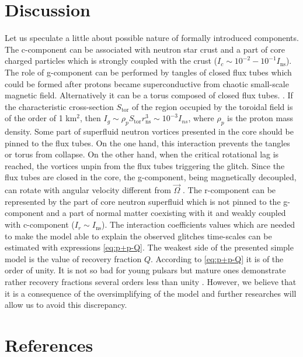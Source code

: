 \documentclass[a4paper]{jpconf}
\begin{document}
          
  \section{Discussion}    
    Let us speculate a little about possible nature of formally introduced components.
    The c-component can be associated with neutron star crust and a part of core charged particles which is strongly coupled with the crust ($I_c\sim10^{-2}-10^{-1}I_\mathrm{ns}$). 
    The role of g-component can be performed by tangles of closed flux tubes which could be formed after protons became superconductive from chaotic small-scale magnetic field.
     Alternatively it can be a torus composed of closed flux tubes.
     \cite{GugercinougluAlpar2014}. If the characteristic cross-section $S_\mathrm{tor}$ of the region occupied by the toroidal field is of the order of 1 km$^{2}$, then $I_g\sim \rho_p S_\mathrm{tor} r_\mathrm{ns}^3 \sim 10^{-3}I_{ns}$, where $\rho_p$ is the proton mass density.
    Some part of superfluid neutron vortices presented in the core should be pinned to the flux tubes. On the one hand, this interaction prevents the tangles or torus from collapse. On the other hand, when the critical rotational lag is reached, the vortices unpin from the flux tubes triggering the glitch.
    Since the flux tubes are closed in the core, the g-component, being magnetically decoupled, can rotate with angular velocity different from $\vec{\Omega}$ \cite{GlampedakisLasky2015}.
    The r-component can be represented by the part of core neutron superfluid
    which is not pinned to the g-component and a part of normal matter coexisting with it and weakly coupled with c-component ($I_r\sim I_\mathrm{ns}$).
    The interaction coefficients values which are needed to make the model able to explain the observed glitches time-scales can be estimated with expressions \eqref{eq:p+p-Q}.
    The weakest side of the presented simple model is the value of recovery fraction $Q$. According to \eqref{eq:p+p-Q} it is of the order of unity. It is not so bad for young pulsars but mature ones demonstrate rather recovery fractions several orders less than unity \cite{LyneShemarSmith2000}. However, we believe that it is a consequence of the oversimplifying of the model and further researches will allow us to avoid this discrepancy. 
      
  \section*{References}
       
\end{document}
